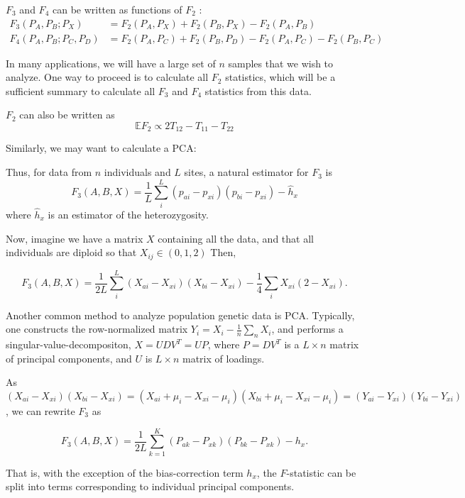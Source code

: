 \documentclass[9pt,twocolumn,twoside,lineno]{pnas-new}
\begin{document}
$F_3$ and $F_4$ can be written as functions of $F_2$ \cite{peter2016}: 
\begin{align}
F_3(P_A, P_B; P_X) &= F_2(P_A, P_X) + F_2(P_B, P_X) - F_2(P_A, P_B)\\
F_4(P_A, P_B; P_C, P_D) &= F_2(P_A, P_C) + F_2(P_B, P_D) - F_2(P_A, P_C) - F_2(P_B, P_C)
\end{align}

In many applications, we will have a large set of $n$ samples that we wish to analyze. One way to proceed is to calculate all $F_2$ statistics, which will be a sufficient summary to calculate all $F_3$ and $F_4$ statistics from this data. 

$F_2$ can also be written as 
$$\mathbb{E}F_2 \propto 2T_{12} - T_{11} - T_{22}$$

Similarly, we may want to calculate a PCA: 


Thus, for data from $n$ individuals and $L$ sites, a natural estimator for $F_3$ is
\begin{equation}
    F_3(A, B, X) = \frac{1}{L}\sum_i^L (p_{ai} - p_{xi})(p_{bi} - p_{xi}) - \hat{h}_x
\end{equation}
where $\hat{h}_x$ is an estimator of the heterozygosity.

Now, imagine we have a matrix $X$ containing all the data, and that all individuals are diploid so that $X_{ij} \in (0,1,2)$ Then, 

\begin{equation}
    F_3(A, B, X) = \frac{1}{2L}\sum_i^L (X_{ai} - X_{xi})(X_{bi} - X_{xi}) - \frac{1}{4}\sum_i X_{xi}(2-X_{xi}).
\end{equation}

Another common method to analyze population genetic data is PCA. Typically, \cite{mcvean2009} one constructs the row-normalized matrix $Y_i = X_i - \frac{1}{n}\sum_n X_i$, and performs a singular-value-decompositon, $X=UDV^T = UP$, where $P = DV^T$ is a $L \times n$ matrix of principal components, and $U$ is $L \times n$ matrix of loadings. 

As $(X_{ai}-X_{xi})(X_{bi}-X_{xi}) = (X_{ai}+\mu_i -X_{xi} - \mu_i)(X_{bi} + \mu_i-X_{xi}-\mu_i) = (Y_{ai}-Y_{xi})(Y_{bi}-Y_{xi})$, we can rewrite $F_3$ as

\begin{equation}
    F_3(A, B, X) = \frac{1}{2L}\sum_{k=1}^K (P_{ak}  - P_{xk})(P_{bk} - P_{xk}) - h_x.
\end{equation}

That is, with the exception of the bias-correction term $h_x$, the $F$-statistic can be split into terms corresponding to individual principal components.
\end{document}
